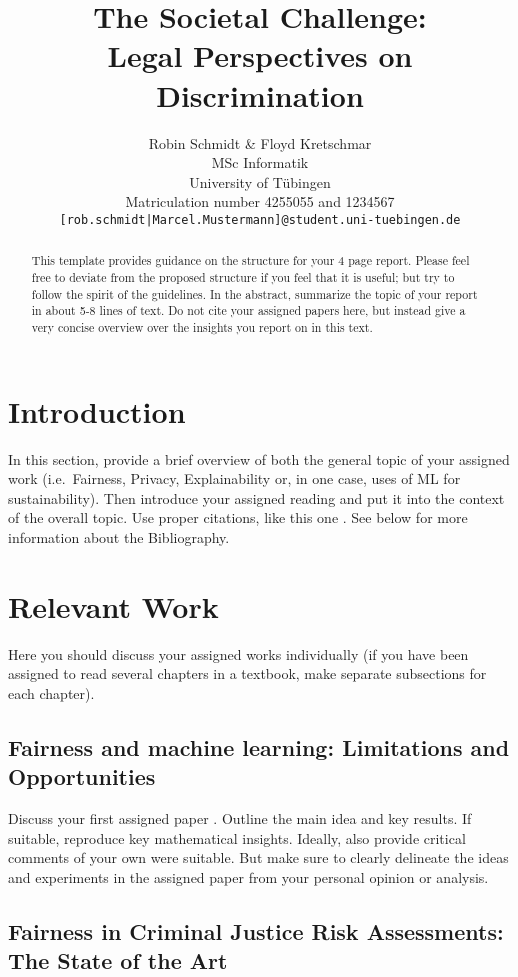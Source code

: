 \documentclass{article}
\title{The Societal Challenge: \\ Legal Perspectives on Discrimination}
\author{%
  Robin Schmidt \& Floyd Kretschmar\\
  MSc Informatik \\
  University of Tübingen\\
  Matriculation number 4255055 and 1234567\\
  \texttt{[rob.schmidt|Marcel.Mustermann]@student.uni-tuebingen.de}
}
\begin{document}
\maketitle

\begin{abstract}
  This template provides guidance on the structure for your 4 page report. Please feel free to deviate from the proposed structure if you feel that it is useful; but try to follow the spirit of the guidelines.
  In the abstract, summarize the topic of your report in about 5-8 lines of text. Do not cite your assigned papers here, but instead give a very concise overview over the insights you report on in this text.
\end{abstract}

\section{Introduction}

In this section, provide a brief overview of both the general topic of your assigned work (i.e.~Fairness, Privacy, Explainability or, in one case, uses of ML for sustainability). Then introduce your assigned reading and put it into the context of the overall topic. Use proper citations, like this one \cite{Berk.2018}. See below for more information about the Bibliography.

\section{Relevant Work}

Here you should discuss your assigned works individually (if you have been assigned to read several chapters in a textbook, make separate subsections for each chapter).

\subsection{Fairness and machine learning: Limitations and Opportunities}

Discuss your first assigned paper \cite{barocas-hardt-narayanan}. Outline the main idea and key results. If suitable, reproduce key mathematical insights. Ideally, also provide critical comments of your own were suitable. But make sure to clearly delineate the ideas and experiments in the assigned paper from your personal opinion or analysis.

\subsection{Fairness in Criminal Justice Risk Assessments: The State of the Art}
\end{document}

